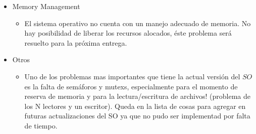 \documentclass[english]{article}
\begin{document}
\begin{itemize}
\item Memory Management
\begin{itemize}
\item El sistema operativo no cuenta con un manejo adecuado de memoria. No hay posibilidad de liberar los recursos alocados, éste problema será resuelto para la próxima entrega.
\end{itemize}

\item Otros
\begin{itemize}
\item Uno de los problemas mas importantes que tiene la actual versión del
$SO$ es la falta de semáforos y mutexs, especialmente para el momento
de reserva de memoria y para la lectura/escritura de archivos! (problema
de los N lectores y un escritor). Queda en la lista de cosas para
agregar en futuras actualizaciones del SO ya que no pudo ser implementad
por falta de tiempo.
\end{itemize}
\end{itemize}
\end{document}
